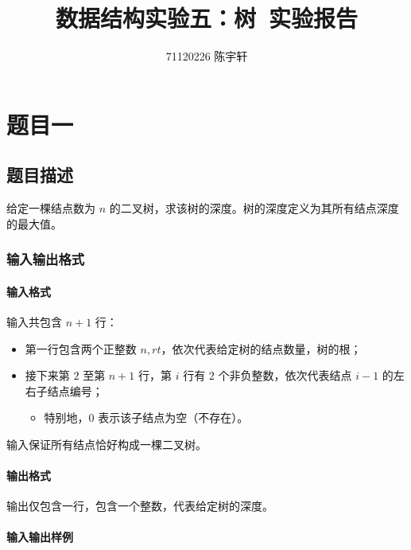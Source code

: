 \documentclass[no-math]{ctexrep}
\author{71120226 陈宇轩}
\title{数据结构实验五：树\ 实验报告}
\begin{document}
    \maketitle

    \tableofcontents

    \chapter{题目一}

    \section{题目描述}

    给定一棵结点数为 $n$ 的二叉树，求该树的深度。树的深度定义为其所有结点深度的最大值。

    \subsection{输入输出格式}

    \subsubsection{输入格式}

    输入共包含 $n + 1$ 行：

    \begin{itemize}
        \item 第一行包含两个正整数 $n, rt$，依次代表给定树的结点数量，树的根；
        \item 接下来第 $2$ 至第 $n + 1$ 行，第 $i$ 行有 2 个非负整数，依次代表结点 $i - 1$ 的左右子结点编号；
        \begin{itemize}
            \item 特别地，0 表示该子结点为空（不存在）。
        \end{itemize}
    \end{itemize}

    输入保证所有结点恰好构成一棵二叉树。

    \subsubsection{输出格式}

    输出仅包含一行，包含一个整数，代表给定树的深度。

    \subsubsection{输入输出样例}
\end{document}
